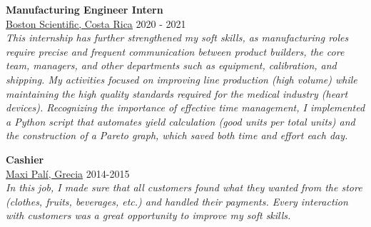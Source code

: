     \begin{tcolorbox}[title=Experience \faBriefcase, colframe=blue!25!black]
        
        \textbf{Manufacturing Engineer Intern}\\
        \faMapMarker \hspace{0mm} \href{https://www.bostonscientific.com/en-US/Home.html}{Boston Scientific, Costa Rica}  \hspace{10.3cm} \faCalendar \hspace{0mm} 2020 - 2021\\
        \textit{This internship has further strengthened my soft skills, as manufacturing roles require precise and frequent communication between product builders, the core team, managers, and other departments such as equipment, calibration, and shipping. My activities focused on improving line production (high volume) while maintaining the high quality standards required for the medical industry (heart devices). Recognizing the importance of effective time management, I implemented a Python script that automates yield calculation (good units per total units) and the construction of a Pareto graph, which saved both time and effort each day.}
        
        \tcbline
        
        \textbf{Cashier}\\
        \faMapMarker \hspace{0mm} \href{https://maxipali.co.cr/}{Maxi Palí, Grecia} \hspace{12cm} \faCalendar \hspace{0mm} 2014-2015 \\
        \textit{In this job, I made sure that all customers found what they wanted from the store (clothes, fruits, beverages, etc.) and handled their payments. Every interaction with customers was a great opportunity to improve my soft skills.}
       
        
    \end{tcolorbox}